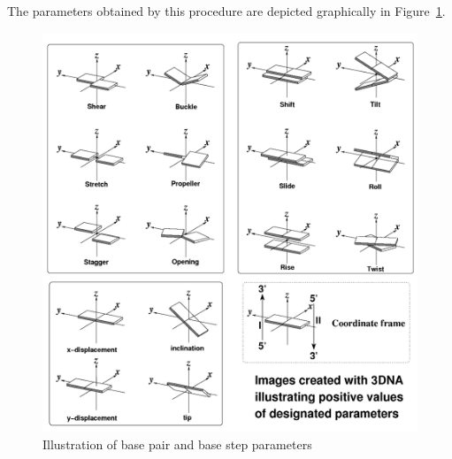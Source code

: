 The parameters obtained by  this procedure are depicted graphically in
Figure~\ref{fig:allparam}.
\begin{figure}[htbp]
\centering
\includegraphics[scale=0.6]{Chapter1/allparam2.png}
\caption{Illustration of base pair and base step parameters \cite{lu2003}}
\label{fig:allparam}
\end{figure}



